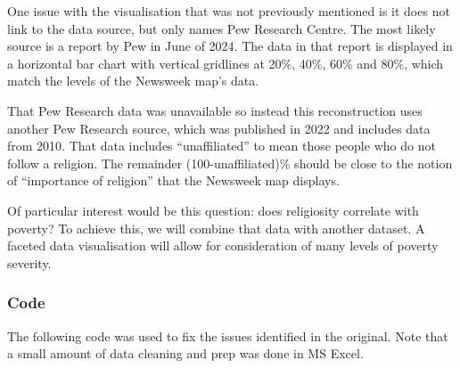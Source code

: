 \documentclass[
]{article}
\begin{document}
One issue with the visualisation that was not previously mentioned is it
does not link to the data source, but only names Pew Research Centre.
The most likely source is a report by Pew in June of 2024. The data in
that report is displayed in a horizontal bar chart with vertical
gridlines at 20\%, 40\%, 60\% and 80\%, which match the levels of the
Newsweek map's data.

That Pew Research data was unavailable so instead this reconstruction
uses another Pew Research source, which was published in 2022 and
includes data from 2010. That data includes ``unaffiliated'' to mean
those people who do not follow a religion. The remainder
(100-unaffiliated)\% should be close to the notion of ``importance of
religion'' that the Newsweek map displays.

Of particular interest would be this question: does religiosity
correlate with poverty? To achieve this, we will combine that data with
another dataset. A faceted data visualisation will allow for
consideration of many levels of poverty severity.

\subsubsection{Code}\label{code}

The following code was used to fix the issues identified in the
original. Note that a small amount of data cleaning and prep was done in
MS Excel.
\end{document}
